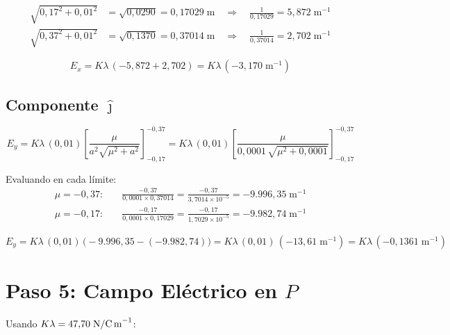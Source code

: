 \documentclass[12pt,letterpaper]{article}
\begin{document}
\begin{align*}
    \sqrt{0{,}17^2 + 0{,}01^2} &= \sqrt{0{,}0290} = 0{,}17029\;\text{m}
    \quad\Rightarrow\quad \frac{1}{0{,}17029} = 5{,}872\;\text{m}^{-1}\\
    \sqrt{0{,}37^2 + 0{,}01^2} &= \sqrt{0{,}1370} = 0{,}37014\;\text{m}
    \quad\Rightarrow\quad \frac{1}{0{,}37014} = 2{,}702\;\text{m}^{-1}
\end{align*}

\begin{equation*}
    E_x = K\lambda\,(-5{,}872 + 2{,}702) = K\lambda\,(-3{,}170\;\text{m}^{-1})
\end{equation*}

\subsection*{Componente $\hat{\jmath}$}

\begin{equation*}
    E_y = K\lambda\,(0{,}01)\left[\frac{\mu}{a^2\sqrt{\mu^2 + a^2}}\right]_{-0{,}17}^{-0{,}37}
        = K\lambda\,(0{,}01)\left[\frac{\mu}{0{,}0001\,\sqrt{\mu^2 + 0{,}0001}}\right]_{-0{,}17}^{-0{,}37}
\end{equation*}

Evaluando en cada l\'imite:
\begin{align*}
    \mu = -0{,}37:\quad
    &\frac{-0{,}37}{0{,}0001\times 0{,}37014} = \frac{-0{,}37}{3{,}7014\times10^{-5}}
    = -9{.}996{,}35\;\text{m}^{-1}\\
    \mu = -0{,}17:\quad
    &\frac{-0{,}17}{0{,}0001\times 0{,}17029} = \frac{-0{,}17}{1{,}7029\times10^{-5}}
    = -9{.}982{,}74\;\text{m}^{-1}
\end{align*}

\begin{equation*}
    E_y = K\lambda\,(0{,}01)\,\bigl(-9{.}996{,}35 - (-9{.}982{,}74)\bigr)
        = K\lambda\,(0{,}01)\,(-13{,}61\;\text{m}^{-1})
        = K\lambda\,(-0{,}1361\;\text{m}^{-1})
\end{equation*}

\section*{Paso 5: Campo El\'ectrico en $P$}

Usando $K\lambda = 47{,}70\;\text{N/C\,m}^{-1}$:
\end{document}

